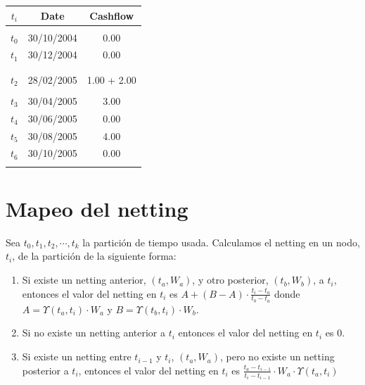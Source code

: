 \begin{minipage}[c]{0.5\columnwidth}%
\centering
\begin{tabular}{c|c|c}
\textbf{$t_i$} & \textbf{Date}  & \textbf{Cashflow} \\
\hline
      &            &      \\
$t_0$ & 30/10/2004 & 0.00 \\
$t_1$ & 30/12/2004 & 0.00 \\
      &            &      \\
      &            &      \\
$t_2$ & 28/02/2005 & 1.00 + 2.00 \\
      &            &      \\
$t_3$ & 30/04/2005 & 3.00 \\
$t_4$ & 30/06/2005 & 0.00 \\
$t_5$ & 30/08/2005 & 4.00 \\
$t_6$ & 30/10/2005 & 0.00 \\
      &            &      \\
\end{tabular}
\end{minipage}%


\section{Mapeo del netting}

Sea $t_0, t_1, t_2, \cdots, t_k$ la partici\'on de tiempo usada.
Calculamos el netting en un nodo, $t_i$, de la partici\'on de la
siguiente forma:

\begin{enumerate}
\item Si existe un netting anterior, $(t_a,W_a)$, y otro posterior, $(t_b,W_b)$,
a $t_i$, entonces el valor del netting en $t_i$ es
$A + (B-A) \cdot \frac{t_i-t_a}{t_b-t_a}$ donde
$A=\Upsilon(t_a,t_i) \cdot W_a$ y $B=\Upsilon(t_b,t_i) \cdot W_b$.
\item Si no existe un netting anterior a $t_i$ entonces el valor del netting
en $t_i$ es $0$.
\item Si existe un netting entre $t_{i-1}$ y $t_i$, $(t_a,W_a)$, pero no existe un
netting posterior a $t_i$, entonces el valor del netting en $t_i$ es
$\frac{t_a-t_{i-1}}{t_i-t_{i-1}} \cdot W_a \cdot \Upsilon(t_a,t_i)$
\end{enumerate}

